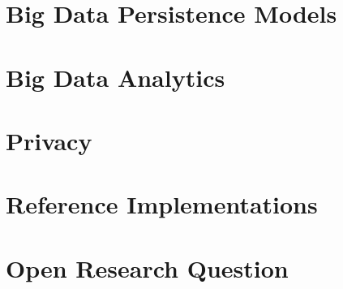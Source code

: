 \documentclass[twocolumn]{article}
\begin{document}
\section{Big Data Persistence Models}

\section{Big Data Analytics}

\section{Privacy}

\section{Reference Implementations}

\section{Open Research Question}



\end{document}
